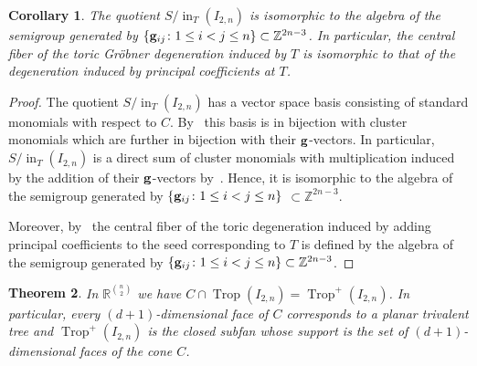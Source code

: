 \documentclass[pdftex]{sigma}%
\newtheorem{Theorem}{Theorem}[section]
\newtheorem{Corollary}[Theorem]{Corollary}
\numberwithin{equation}{section}
\DeclareMathOperator{\init}{in}
\DeclareMathOperator{\trop}{Trop}
\begin{document}
\begin{Corollary}
The quotient $S/\init_{T}(I_{2,n})$ is isomorphic to the algebra of the semigroup gene\-rated by $\{{\bf g}_{ij}\colon 1\le i<j\le n\}\subset \mathbb Z^{2n-3}$.
In particular, the central fiber of the toric Gr\"obner degeneration induced by $T$ is isomorphic to that of the degeneration induced by principal coefficients at $T$.
\end{Corollary}
\begin{proof}
The quotient $S/\init_{T}(I_{2,n})$ has a vector space basis consisting of standard monomials with respect to $C$. By~ this basis is in bijection with cluster monomials which are further in bijection with their ${\bf g}$-vectors.
In particular, $S/\init_{T}(I_{2,n})$ is a direct sum of cluster monomials with multiplication induced by the addition of their ${\bf g}$-vectors by~.
Hence, it is isomorphic to the algebra of the semigroup generated by $\{{\bf g}_{ij}\colon 1\le i<j\le n\}$ $\subset \mathbb Z^{2n-3}$.

Moreover, by~\cite[Theorem~8.30]{GHKK} the central fiber of the toric degeneration induced by adding principal coefficients to the seed corresponding to $T$ is defined by the algebra of the semigroup generated by $\{{\bf g}_{ij}\colon 1\le i<j\le n\}\subset \mathbb Z^{2n-3}$.
\end{proof}




\begin{Theorem}
In $\mathbb R^{\binom{n}{2}}$ we have $C\cap \trop(I_{2,n})=\trop^+(I_{2,n})$.
In particular, every $(d+1)$-dimensional face of $C$ corresponds to a planar trivalent tree and $\trop^+(I_{2,n})$ is the closed subfan whose support is the set of $(d+1)$-dimensional faces of the cone $C$.
\end{Theorem}
\end{document}
